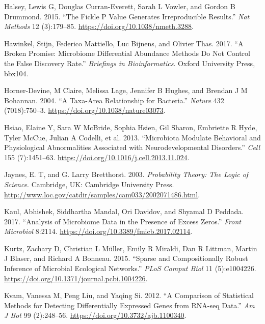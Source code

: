 \documentclass[onecolumn]{book}
\theoremstyle{definition}
\theoremstyle{definition}
\theoremstyle{definition}
\theoremstyle{remark}
\begin{document}
\leavevmode\hypertarget{ref-Halsey:2015aa}{}%
Halsey, Lewis G, Douglas Curran-Everett, Sarah L Vowler, and Gordon B
Drummond. 2015. ``The Fickle P Value Generates Irreproducible Results.''
\emph{Nat Methods} 12 (3):179--85.
\url{https://doi.org/10.1038/nmeth.3288}.

\leavevmode\hypertarget{ref-hawinkel2017}{}%
Hawinkel, Stijn, Federico Mattiello, Luc Bijnens, and Olivier Thas.
2017. ``A Broken Promise: Microbiome Differential Abundance Methods Do
Not Control the False Discovery Rate.'' \emph{Briefings in
Bioinformatics}. Oxford University Press, bbx104.

\leavevmode\hypertarget{ref-Horner-Devine:2004aa}{}%
Horner-Devine, M Claire, Melissa Lage, Jennifer B Hughes, and Brendan J
M Bohannan. 2004. ``A Taxa-Area Relationship for Bacteria.''
\emph{Nature} 432 (7018):750--3.
\url{https://doi.org/10.1038/nature03073}.

\leavevmode\hypertarget{ref-Hsiao:2013}{}%
Hsiao, Elaine Y, Sara W McBride, Sophia Hsien, Gil Sharon, Embriette R
Hyde, Tyler McCue, Julian A Codelli, et al. 2013. ``Microbiota Modulate
Behavioral and Physiological Abnormalities Associated with
Neurodevelopmental Disorders.'' \emph{Cell} 155 (7):1451--63.
\url{https://doi.org/10.1016/j.cell.2013.11.024}.

\leavevmode\hypertarget{ref-Jaynes:2003}{}%
Jaynes, E. T, and G. Larry Bretthorst. 2003. \emph{Probability Theory:
The Logic of Science}. Cambridge, UK: Cambridge University Press.
\url{http://www.loc.gov/catdir/samples/cam033/2002071486.html}.

\leavevmode\hypertarget{ref-Kaul:2017aa}{}%
Kaul, Abhishek, Siddhartha Mandal, Ori Davidov, and Shyamal D Peddada.
2017. ``Analysis of Microbiome Data in the Presence of Excess Zeros.''
\emph{Front Microbiol} 8:2114.
\url{https://doi.org/10.3389/fmicb.2017.02114}.

\leavevmode\hypertarget{ref-Kurtz:2015}{}%
Kurtz, Zachary D, Christian L Müller, Emily R Miraldi, Dan R Littman,
Martin J Blaser, and Richard A Bonneau. 2015. ``Sparse and
Compositionally Robust Inference of Microbial Ecological Networks.''
\emph{PLoS Comput Biol} 11 (5):e1004226.
\url{https://doi.org/10.1371/journal.pcbi.1004226}.

\leavevmode\hypertarget{ref-Kvam:2012}{}%
Kvam, Vanessa M, Peng Liu, and Yaqing Si. 2012. ``A Comparison of
Statistical Methods for Detecting Differentially Expressed Genes from
RNA-seq Data.'' \emph{Am J Bot} 99 (2):248--56.
\url{https://doi.org/10.3732/ajb.1100340}.
\end{document}
